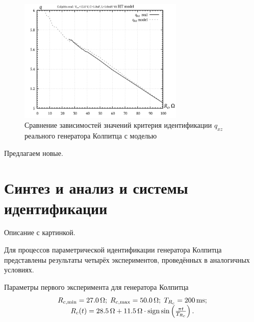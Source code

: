 \begin{figure}[htb!]
\centerline{\includegraphics[width=0.7\textwidth]{p/colp_q_cml.png} }
\caption{Сравнение зависимостей значений критерия идентификации $q_{xz}$ реального генератора Колпитца с моделью}
\label{atu:f:colp_q_cml}
\end{figure}

Предлагаем новые.


\section{Синтез и анализ и системы идентификации}  %

Описание с картинкой.

Для процессов параметрической идентификации генератора Колпитца представлены результаты четырёх экспериментов,
проведённых в аналогичных условиях.


Параметры первого эксперимента для генератора Колпитца
%
\begin{equation}
  \begin{array}{c}
    R_{c,\min} = \SI{27.0}{\ohm};
    \;
    R_{c,\max} = \SI{50.0}{\ohm};
    \;
    T_{R_c} = \SI{200}{\milli\second};
  \\
    R_c(t) = \SI{28.5}{\ohm} + \SI{11.5}{\ohm} \cdot \operatorname*{sign} \sin \left(  \frac{\pi t}{T_{R_c}}  \right).
  \end{array}
  \label{atu:eq:colp_test1_cond}
\end{equation}

